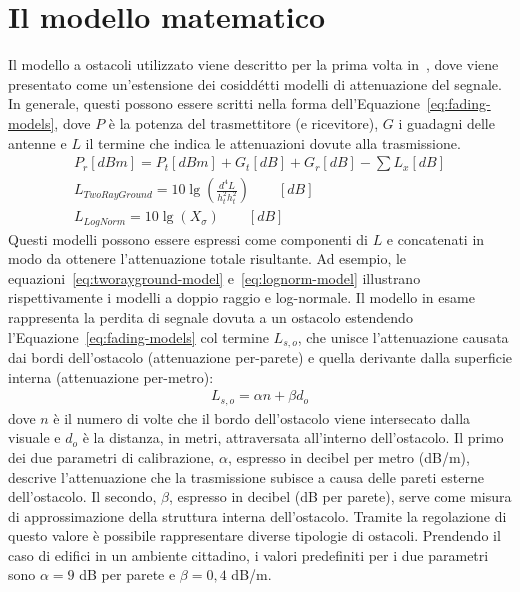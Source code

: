 \section{Il modello matematico}\label{sec:il-modello-matematico}{\vspace*{-.3\baselineskip}} %
Il modello a ostacoli utilizzato viene descritto per la prima volta in~\cite{5720204}, dove viene presentato
come un'estensione dei cosiddétti modelli di attenuazione del segnale.
In generale, questi possono essere scritti nella forma dell'Equazione~\ref{eq:fading-models}, dove $P$ è la potenza del trasmettitore (e ricevitore),
$G$ i guadagni delle antenne e $L$ il termine che indica le attenuazioni dovute alla trasmissione.
%
\begin{gather}
	P_r[dBm] = P_t[dBm] + G_t[dB] + G_r[dB] - \sum L_x[dB] 														\label{eq:fading-models} \\
	L_{TwoRayGround} = 10 \lg \left( \frac{d^4 L}{h^2_t h^2_t} \right)	\qquad [dB]		\label{eq:tworayground-model} \\
	L_{LogNorm} = 10 \lg \left( X_\sigma \right)	\qquad [dB]													\label{eq:lognorm-model}
\end{gather}
%
Questi modelli possono essere espressi come componenti di $L$ e concatenati in modo da ottenere l'attenuazione totale risultante.
Ad esempio, le equazioni~\ref{eq:tworayground-model} e~\ref{eq:lognorm-model} illustrano rispettivamente i modelli a doppio raggio e log-normale.
Il modello in esame rappresenta la perdita di segnale dovuta a un ostacolo estendendo l'Equazione~\ref{eq:fading-models}
col termine $L_{s,o}$, che unisce l'attenuazione causata dai bordi dell'ostacolo (attenuazione per-parete)
e quella derivante dalla superficie interna (attenuazione per-metro):
%
\begin{gather}\label{eq:osbtacle-model}
	L_{s,o} = \alpha n + \beta d_o
\end{gather}
dove $n$ è il numero di volte che il bordo dell'ostacolo viene intersecato dalla visuale e $d_o$ è la distanza, in metri, attraversata all'interno dell'ostacolo.
Il primo dei due parametri di calibrazione, $\alpha$, espresso in decibel per metro (dB/m), descrive l'attenuazione
che la trasmissione subisce a causa delle pareti esterne dell'ostacolo.
Il secondo, $\beta$, espresso in decibel (dB per parete), serve come misura di approssimazione della struttura interna dell'ostacolo.
Tramite la regolazione di questo valore è possibile rappresentare diverse tipologie di ostacoli.
Prendendo il caso di edifici in un ambiente cittadino, i valori predefiniti per i due parametri sono $\alpha = 9$ dB per parete e $\beta = 0,4$ dB/m.
